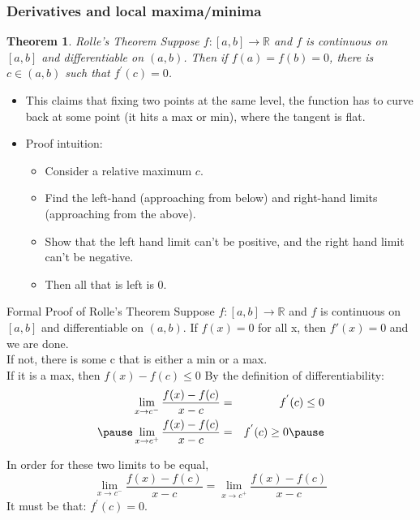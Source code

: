 \documentclass[aspectratio=169, handout]{beamer}
\newtheorem{thm}{Theorem}
\numberwithin{equation}{section}
\begin{document}
\begin{frame}
\frametitle{Derivatives and local maxima/minima}

\begin{thm} Rolle's Theorem Suppose $f:[a,b] \rightarrow \mathbb{R}$ and $f$ is continuous on $[a,b]$ and differentiable on $(a,b)$.  Then if $f(a) = f(b) = 0$, there is $c \in (a, b)$ such that $f^{'}(c) = 0$.  \end{thm}\pause

\begin{itemize}
\item This claims that fixing two points at the same level, the function has to curve back at some point (it hits a max or min), where the tangent is flat.\pause
\item Proof intuition:\pause
\begin{itemize}
\item Consider a relative maximum $c$. \pause
\item Find the left-hand (approaching from below) and right-hand limits (approaching from the above).\pause
\item Show that the left hand limit can't be positive, and the right hand limit can't be negative.
\item Then all that is left is 0.
\end{itemize}
\end{itemize}
\end{frame}


\begin{frame}{Formal Proof of Rolle's Theorem}
Suppose $f:[a,b] \rightarrow \mathbb{R}$ and $f$ is continuous on $[a,b]$ and differentiable on $(a,b)$.  \pause
If $f(x)=0$ for all x, then $f'(x)=0$ and we are done.\\ \pause
If not, there is some c that is either a min or a max.\\
If it is a max, then $f(x)-f(c)\leq0$
By the definition of differentiability: \pause
\begin{eqnarray}
\lim_{x \rightarrow c^{-}} \frac{f(x) - f(c ) }{x - c } & = & f^{'}(c)\leq0 \nonumber \\\pause
\lim_{x \rightarrow c^{+}} \frac{f(x) - f(c) } {x - c }  &  =  & f^{'}(c)\geq0  \nonumber \pause
\end{eqnarray}

In order for these two limits to be equal, \\
$$\lim_{x \rightarrow c^{-}} \frac{f(x) - f(c) }{x -c}  = \lim_{x \rightarrow c^{+}} \frac{f(x) - f(c) } {x - c} $$
It must be that: $f^{'}(c) = 0$.  

\end{frame}
\end{document}
